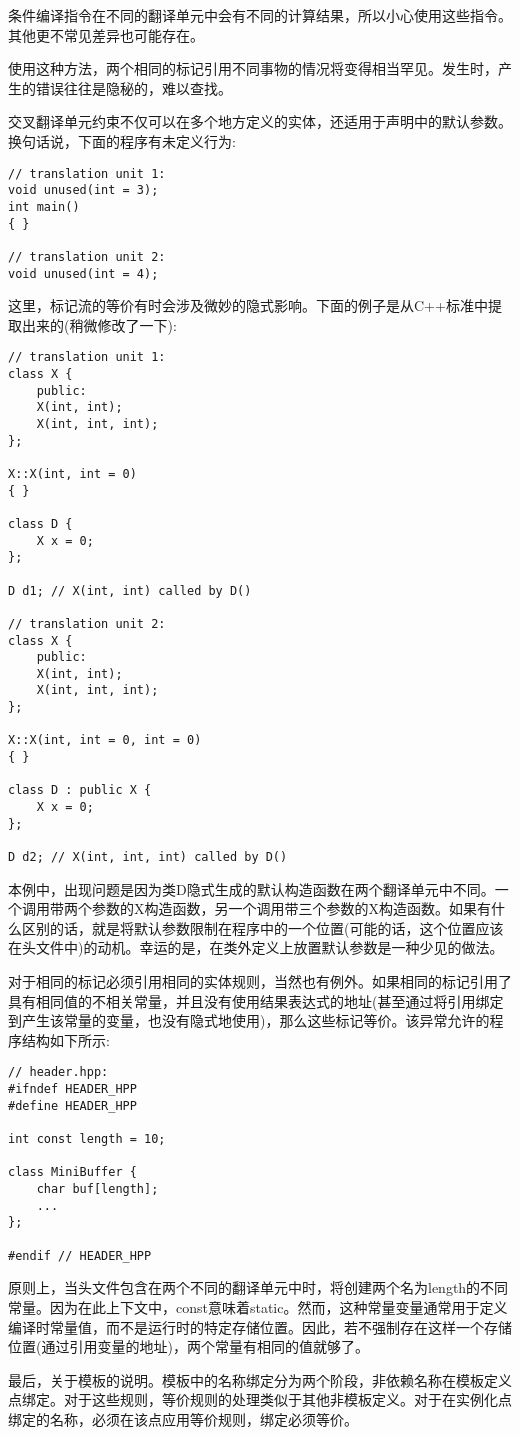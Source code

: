 \begin{tcolorbox}[colback=webgreen!5!white,colframe=webgreen!75!black]
\hspace*{0.75cm}条件编译指令在不同的翻译单元中会有不同的计算结果，所以小心使用这些指令。其他更不常见差异也可能存在。
\end{tcolorbox}

使用这种方法，两个相同的标记引用不同事物的情况将变得相当罕见。发生时，产生的错误往往是隐秘的，难以查找。

交叉翻译单元约束不仅可以在多个地方定义的实体，还适用于声明中的默认参数。换句话说，下面的程序有未定义行为:

\begin{lstlisting}[style=styleCXX]
// translation unit 1:
void unused(int = 3);
int main()
{ }

// translation unit 2:
void unused(int = 4);
\end{lstlisting}

这里，标记流的等价有时会涉及微妙的隐式影响。下面的例子是从C++标准中提取出来的(稍微修改了一下):

\begin{lstlisting}[style=styleCXX]
// translation unit 1:
class X {
	public:
	X(int, int);
	X(int, int, int);
};

X::X(int, int = 0)
{ }

class D {
	X x = 0;
};

D d1; // X(int, int) called by D()

// translation unit 2:
class X {
	public:
	X(int, int);
	X(int, int, int);
};

X::X(int, int = 0, int = 0)
{ }

class D : public X {
	X x = 0;
};

D d2; // X(int, int, int) called by D()
\end{lstlisting}

本例中，出现问题是因为类D隐式生成的默认构造函数在两个翻译单元中不同。一个调用带两个参数的X构造函数，另一个调用带三个参数的X构造函数。如果有什么区别的话，就是将默认参数限制在程序中的一个位置(可能的话，这个位置应该在头文件中)的动机。幸运的是，在类外定义上放置默认参数是一种少见的做法。

对于相同的标记必须引用相同的实体规则，当然也有例外。如果相同的标记引用了具有相同值的不相关常量，并且没有使用结果表达式的地址(甚至通过将引用绑定到产生该常量的变量，也没有隐式地使用)，那么这些标记等价。该异常允许的程序结构如下所示:

\begin{lstlisting}[style=styleCXX]
// header.hpp:
#ifndef HEADER_HPP
#define HEADER_HPP

int const length = 10;

class MiniBuffer {
	char buf[length];
	...
};

#endif // HEADER_HPP
\end{lstlisting}

原则上，当头文件包含在两个不同的翻译单元中时，将创建两个名为length的不同常量。因为在此上下文中，const意味着static。然而，这种常量变量通常用于定义编译时常量值，而不是运行时的特定存储位置。因此，若不强制存在这样一个存储位置(通过引用变量的地址)，两个常量有相同的值就够了。

最后，关于模板的说明。模板中的名称绑定分为两个阶段，非依赖名称在模板定义点绑定。对于这些规则，等价规则的处理类似于其他非模板定义。对于在实例化点绑定的名称，必须在该点应用等价规则，绑定必须等价。





